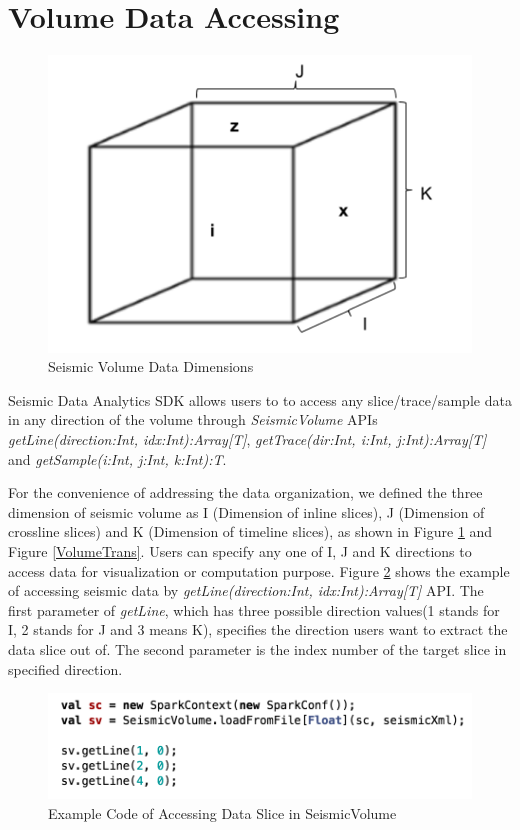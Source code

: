 \section{Volume Data Accessing}

\begin{figure}[h]
\centering
\includegraphics[scale=0.6]{figures/VolumeDim.png}
\caption{Seismic Volume Data Dimensions}
\label{VolumeDim}
\end{figure}

Seismic Data Analytics SDK allows users to to access any slice/trace/sample data in any direction of the volume through \emph{SeismicVolume} APIs \emph{getLine(direction:Int, idx:Int):Array[T]}, \emph{getTrace(dir:Int, i:Int, j:Int):Array[T]} and \emph{getSample(i:Int, j:Int, k:Int):T}. 

For the convenience of addressing the data organization, we defined the three dimension of seismic volume as I (Dimension of inline slices), J (Dimension of crossline slices) and K (Dimension of timeline slices), as shown in Figure \ref{VolumeDim} and Figure \ref{VolumeTrans}. Users can specify any one of I, J and K directions to access data for visualization or computation purpose.  Figure \ref{code_load_access} shows the example of accessing seismic data by \emph{getLine(direction:Int, idx:Int):Array[T]} API. The first parameter of \emph{getLine}, which has three possible direction values(1 stands for I, 2 stands for J and 3 means K), specifies the direction users want to extract the data slice out of.  The second parameter is the index number of the target slice in specified direction.

\begin{figure}[h]
\centering
\includegraphics[scale=0.8]{figures/code_load_access.png}
\caption{Example Code of Accessing Data Slice in SeismicVolume}
\label{code_load_access}
\end{figure}


